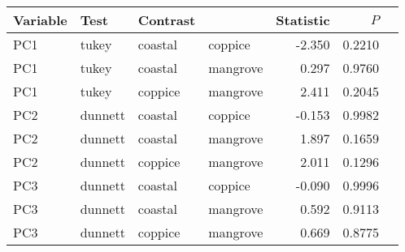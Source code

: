 
\begin{tabular}{llllrrl}
\toprule
Variable & Test & Contrast &  & Statistic & $P$ & \\
\midrule
PC1 & tukey & coastal & coppice & -2.350 & 0.2210 & \\
PC1 & tukey & coastal & mangrove & 0.297 & 0.9760 & \\
PC1 & tukey & coppice & mangrove & 2.411 & 0.2045 & \\
PC2 & dunnett & coastal & coppice & -0.153 & 0.9982 & \\
PC2 & dunnett & coastal & mangrove & 1.897 & 0.1659 & \\
PC2 & dunnett & coppice & mangrove & 2.011 & 0.1296 & \\
PC3 & dunnett & coastal & coppice & -0.090 & 0.9996 & \\
PC3 & dunnett & coastal & mangrove & 0.592 & 0.9113 & \\
PC3 & dunnett & coppice & mangrove & 0.669 & 0.8775 & \\
\bottomrule
\end{tabular}
